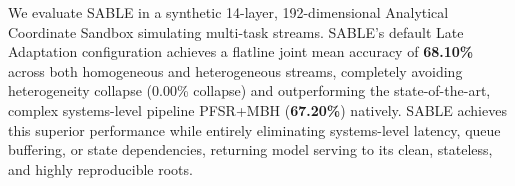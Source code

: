 We evaluate SABLE in a synthetic 14-layer, 192-dimensional Analytical Coordinate Sandbox simulating multi-task streams. SABLE's default Late Adaptation configuration achieves a flatline joint mean accuracy of \textbf{68.10\%} across both homogeneous and heterogeneous streams, completely avoiding heterogeneity collapse (0.00\% collapse) and outperforming the state-of-the-art, complex systems-level pipeline PFSR+MBH (\textbf{67.20\%}) natively. SABLE achieves this superior performance while entirely eliminating systems-level latency, queue buffering, or state dependencies, returning model serving to its clean, stateless, and highly reproducible roots.
